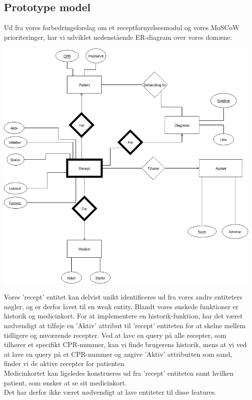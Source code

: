 \subsection{Prototype model}
Ud fra vores forbedringsforslag om et receptfornyelsesmodul og vores MoSCoW prioriteringer, har vi udviklet nedenstående ER-diagram over vores domæne:\\
\begin{center}
	\includegraphics[scale=0.51]{Materials/Prototype/NewERDiagram}
\end{center}
Vores 'recept' entitet kan delvist unikt identificeres ud fra vores andre entiteters nøgler, og er derfor lavet til en weak entity.
Blandt vores ønskede funktioner er historik og medicinkort. For at implementere en historik-funktion, har det været nødvendigt at tilføje en 'Aktiv' attribut til 'recept' entiteten for at skelne mellem tidligere og nuværende recepter. Ved at lave en query på alle recepter, som tilhører et specifikt CPR-nummer, kan vi finde brugerens historik, mens at vi ved at lave en query på et CPR-nummer og angive 'Aktiv' attributten som sand, finder vi de aktive recepter for patienten.\\
Medicinkortet kan ligeledes konstrueres ud fra 'recept' entiteten samt hvilken patient, som ønsker at se sit medicinkort.\\ 
Det har derfor ikke været nødvendigt at lave entiteter til disse features.\\

